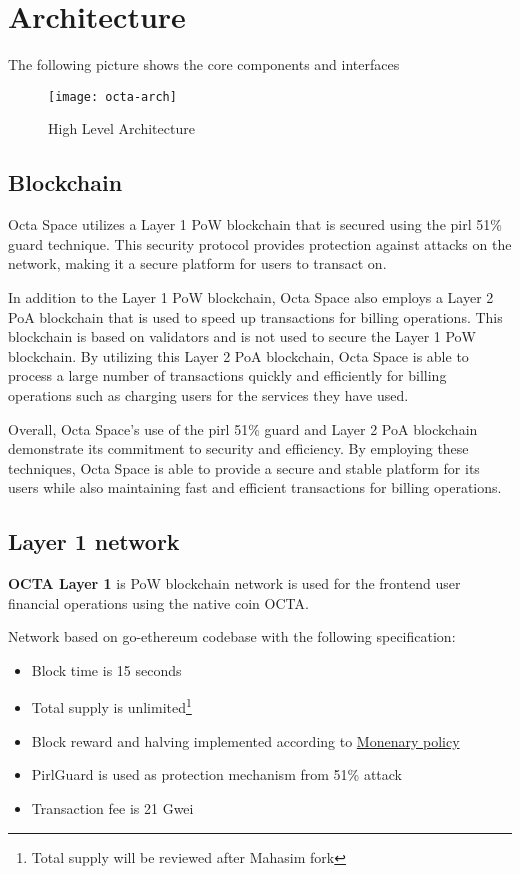 \section{Architecture}

The following picture shows the core components and interfaces

\begin{figure}[h]
    \centering
    \texttt{[image: octa-arch]}
    \caption{High Level Architecture}
\end{figure}

\subsection{Blockchain}
Octa Space utilizes a Layer 1 PoW blockchain that is secured using the pirl 51\% guard technique. This security protocol provides protection against attacks on the network, making it a secure platform for users to transact on.

In addition to the Layer 1 PoW blockchain, Octa Space also employs a Layer 2 PoA blockchain that is used to speed up transactions for billing operations. This blockchain is based on validators and is not used to secure the Layer 1 PoW blockchain. By utilizing this Layer 2 PoA blockchain, Octa Space is able to process a large number of transactions quickly and efficiently for billing operations such as charging users for the services they have used.

Overall, Octa Space's use of the pirl 51\% guard and Layer 2 PoA blockchain demonstrate its commitment to security and efficiency. By employing these techniques, Octa Space is able to provide a secure and stable platform for its users while also maintaining fast and efficient transactions for billing operations.

\newpage

\subsection{Layer 1 network}

\textbf{OCTA Layer 1} is PoW\cite{pow} blockchain network is used for the frontend user financial operations using the native coin OCTA.

Network based on go-ethereum\cite{go-ethereum} codebase with the following specification:

\begin{itemize}
    \item Block time is 15 seconds
    \item Total supply is unlimited\footnote{Total supply will be reviewed after Mahasim fork}
    \item Block reward and halving implemented according to \hyperref[sec:mp]{Monenary policy}
    \item PirlGuard is used as protection mechanism from 51\% attack
    \item Transaction fee is 21 Gwei
\end{itemize}

